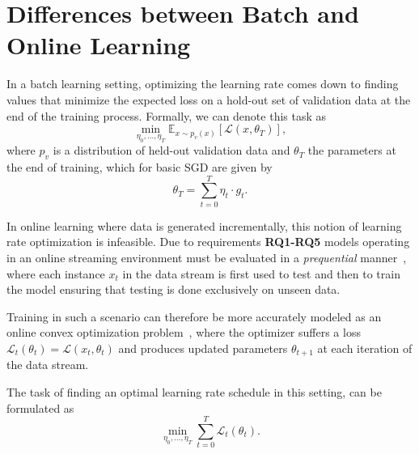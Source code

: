 \documentclass[letterpaper]{article} %
\begin{document}
\section{Differences between Batch and Online Learning}\label{sec:diffs_batch_online}

In a batch learning setting, optimizing the learning rate comes down to finding values that minimize the expected loss on a hold-out set of validation data at the end of the training process.
Formally, we can denote this task as
\begin{equation}
	\label{eq:batch_lr_optim}
	\min_{\eta_0, \ldots, \eta_T} \mathbb{E}_{x \sim p_v(x)}[\mathcal{L}(x, \theta_T)],
\end{equation}
where $p_v$ is a distribution of held-out validation data and $\theta_T$ the parameters at the end of training, which for basic SGD are given by
\begin{equation}
	\theta_T = \sum_{t=0}^{T} \eta_t \cdot g_t.
\end{equation}

In online learning where data is generated incrementally, this notion of learning rate optimization is infeasible.
Due to requirements \textbf{RQ1-RQ5} models operating in an online streaming environment must be evaluated in a \textit{prequential} manner~\cite{bifetMOAMassiveOnline2010}, where each instance $x_t$ in the data stream is first used to test and then to train the model ensuring that testing is done exclusively on unseen data.

Training in such a scenario can therefore be more accurately modeled as an online convex optimization problem~\cite{shalev-shwartzOnlineLearningOnline2011,hazanIntroductionOnlineConvex2016}, where the optimizer suffers a loss $\mathcal{L}_t(\theta_t) = \mathcal{L}(x_t, \theta_{t})$ and produces updated parameters $\theta_{t+1}$ at each iteration of the data stream.

The task of finding an optimal learning rate schedule in this setting, can be formulated as
\begin{equation}
	\label{eq:stream_lr_optim}
	\min_{\eta_0, \ldots, \eta_T} \sum_{t=0}^{T} \mathcal{L}_t(\theta_t).
\end{equation}
\end{document}

